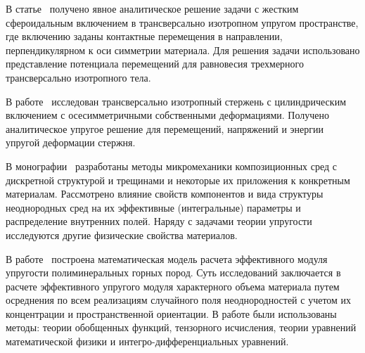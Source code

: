 В статье~\cite{Zureick1988} получено явное аналитическое решение задачи с жестким сфероидальным включением в трансверсально изотропном упругом пространстве, где включению заданы контактные перемещения в направлении, перпендикулярном к оси симметрии материала. Для решения задачи использовано представление потенциала перемещений для равновесия трехмерного трансверсально изотропного тела.

В работе~\cite{Zhong} исследован трансверсально изотропный стержень с цилиндрическим включением с осесимметричными собственными деформациями. Получено аналитическое упругое решение для перемещений, напряжений и энергии упругой деформации стержня.

В монографии~\cite{Vanin1985} разработаны методы микромеханики композиционных сред с дискретной структурой и трещинами и некоторые их приложения к конкретным материалам. Рассмотрено влияние свойств компонентов и вида структуры неоднородных сред на их эффективные (интегральные) параметры и распределение внутренних полей. Наряду с задачами теории упругости исследуются другие физические свойства материалов.


В работе~\cite{Shailiev} построена математическая модель расчета эффективного модуля упругости полиминеральных горных пород. Суть исследований заключается в расчете эффективного упругого модуля характерного объема материала путем осреднения по всем реализациям случайного поля неоднородностей с учетом их концентрации и пространственной ориентации. В работе были использованы методы: теории обобщенных функций, тензорного исчисления, теории уравнений математической физики и ин\-тег\-ро-\-диф\-фе\-рен\-ци\-аль\-ных уравнений.

